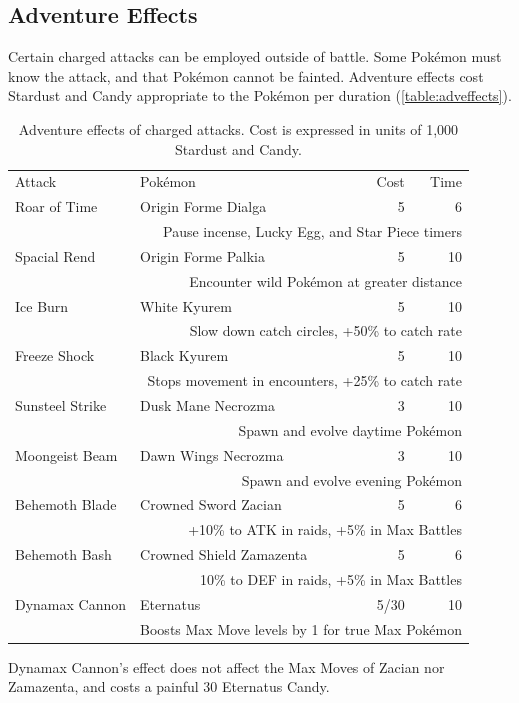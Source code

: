 \subsection{Adventure Effects\label{sec:effects}}
Certain charged attacks can be employed outside of battle.
Some Pokémon must know the attack, and that Pokémon cannot be fainted.
Adventure effects cost Stardust and Candy appropriate to the Pokémon
  per duration (\autoref{table:adveffects}).
\begin{table}
\centering
\begin{tabular}{llrr}
Attack & Pokémon & Cost & Time\\
\Midrule
Roar of Time & Origin Forme Dialga & 5 & 6\\
  & \multicolumn{3}{r}{\footnotesize{}Pause incense, Lucky Egg, and Star Piece timers}\\
Spacial Rend & Origin Forme Palkia & 5 & 10\\
  & \multicolumn{3}{r}{\footnotesize{}Encounter wild Pokémon at greater distance}\\
Ice Burn & White Kyurem & 5 & 10\\
  & \multicolumn{3}{r}{\footnotesize{}Slow down catch circles, +50\% to catch rate}\\
Freeze Shock & Black Kyurem & 5 & 10\\
  & \multicolumn{3}{r}{\footnotesize{}Stops movement in encounters, +25\% to catch rate}\\
Sunsteel Strike & Dusk Mane Necrozma & 3 & 10\\
  & \multicolumn{3}{r}{\footnotesize{}Spawn and evolve daytime Pokémon}\\
Moongeist Beam & Dawn Wings Necrozma & 3 & 10\\
  & \multicolumn{3}{r}{\footnotesize{}Spawn and evolve evening Pokémon}\\
Behemoth Blade & Crowned Sword Zacian & 5 & 6\\
  & \multicolumn{3}{r}{\footnotesize{}+10\% to ATK in raids, +5\% in Max Battles}\\
Behemoth Bash & Crowned Shield Zamazenta & 5 & 6\\
  & \multicolumn{3}{r}{\footnotesize{}10\% to DEF in raids, +5\% in Max Battles}\\
Dynamax Cannon & Eternatus & 5/30 & 10\\
  & \multicolumn{3}{r}{\footnotesize{}Boosts Max Move levels by 1 for true Max Pokémon}\\
\end{tabular}
\caption[Adventure effects of charged attacks]{Adventure effects of charged attacks. Cost is expressed in units of 1,000 Stardust and Candy.\label{table:adveffects}}
\end{table}
Dynamax Cannon's effect does not affect the Max Moves of Zacian nor Zamazenta,
 and costs a painful 30 Eternatus Candy.

